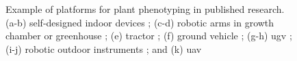 \begin{figure}[htb!]
  \begin{center}
  \end{center}
  \caption[Example of platforms for plant phenotyping]{
    Example of platforms for plant phenotyping in published research. (a-b) self-designed indoor devices \citep{wu_mvs-pheno_2020,schunck_pheno4d_2021}; (c-d) robotic arms in growth chamber or greenhouse \citep{chaudhury_machine_2018, du_greenhouse_2021}; (e) tractor \citep{kusumam_3d_2017}; (f) ground vehicle \citep{liu_estimation_2017}; (g-h) \gls{ugv} \citep{mcguire_high_2021, qiu_field-based_2019}; (i-j) robotic outdoor instruments \citep{bai_nu-spidercam_2019, jin_exploring_2021}; and (k) \gls{uav} \citep{kierdorf_growliflower_2022}
  }
  \label{fig:int1}
\end{figure}